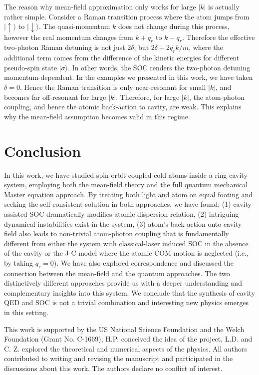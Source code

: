\documentclass[atoms,article,submit,moreauthors,dvi2pdf,12pt,a4paper]{mdpi}
\begin{document}
The reason why mean-field approximation only works for large $|k|$ is actually rather simple. Consider a Raman transition process where the atom jumps from $|\uparrow \rangle$ to $|\downarrow \rangle$. The quasi-momentum $k$ does not change during this process, however the real momentum changes from $k+q_r$ to $k-q_r$. Therefore the effective two-photon Raman detuning is not just $2\delta$, but $2\delta +2q_rk/m$, where the additional term comes from the difference of the kinetic energies for different pseudo-spin state $|\sigma\rangle$. In other words, the SOC renders the two-photon detuning momentum-dependent. In the examples we presented in this work, we have taken $\delta=0$. Hence the Raman transition is only near-resonant for small $|k|$, and becomes far off-resonant for large $|k|$. Therefore, for large $|k|$, the atom-photon coupling, and hence the atomic back-action to cavity, are weak. This explains why the mean-field assumption becomes valid in this regime.


\section{Conclusion} \label{conclusion}

In this work, we have studied spin-orbit coupled cold atoms inside a ring cavity system, employing both the mean-field theory and the full quantum mechanical Master equation approach. By treating both light and atom on equal footing and seeking the self-consistent solution in both approaches, we have found: (1) cavity-assisted SOC dramatically modifies atomic dispersion relation, (2) intriguing dynamical instabilities exist in the system, (3) atom's back-action onto cavity field also leads to non-trivial atom-photon coupling that is fundamentally different from either the system with classical-laser induced SOC in the absence of the cavity or the J-C model where the atomic COM motion is neglected (i.e., by taking $q_r=0$). We have also explored correspondence and discussed the connection between the mean-field and the quantum approaches. The two distinctively different approaches provide us with a deeper understanding and complementary insights into this system. We conclude that the synthesis of cavity QED and SOC is not a trivial combination and interesting new physics emerges in this setting.



This work is supported by the US National Science Foundation and the Welch Foundation (Grant No. C-1669);
H.P. conceived the idea of the project, L.D. and C. Z. explored the theoretical and numerical aspects of the physics. All authors contributed to writing and revising the manuscript and participated in the discussions about this work.
The authors declare no conflict of interest.
\end{document}
